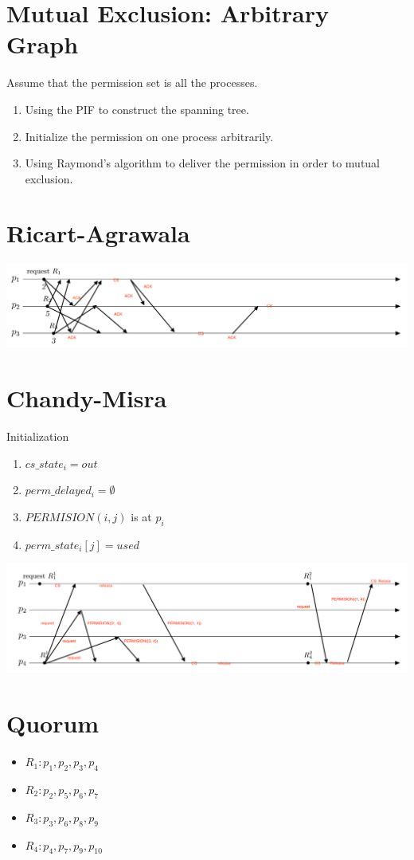 \documentclass{article}
\begin{document}
\section{Mutual Exclusion: Arbitrary Graph}
Assume that the permission set is all the processes. \\
\begin{enumerate}
  \item Using the PIF to construct the spanning tree. \\
  \item Initialize the permission on one process arbitrarily. \\
  \item Using Raymond's algorithm to deliver the permission in order to mutual exclusion.
\end{enumerate}

\section{Ricart-Agrawala}
\includegraphics[width=\textwidth]{p3}

\section{Chandy-Misra}
Initialization
\begin{enumerate}
  \item $cs\_state_i = out$ \\
  \item $perm\_delayed_i = \emptyset$ \\
  \item $PERMISION({i, j})$ is at $p_i$ \\
  \item $perm\_state_i[j] = used$ \\
\end{enumerate}


\includegraphics[width=\textwidth]{p4}


\section{Quorum}
\begin{itemize}
  \item $R_1: p_1,p_2,p_3,p_4$ \\
  \item $R_2: p_2,p_5,p_6,p_7$ \\
  \item $R_3: p_3,p_6,p_8,p_9$ \\
  \item $R_4: p_4,p_7,p_9,p_{10}$ \\
  \end{itemize}
\end{document}
